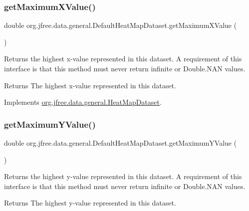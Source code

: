 \subsubsection{\texorpdfstring{get\+Maximum\+X\+Value()}{getMaximumXValue()}}
{\footnotesize\ttfamily double org.\+jfree.\+data.\+general.\+Default\+Heat\+Map\+Dataset.\+get\+Maximum\+X\+Value (\begin{DoxyParamCaption}{ }\end{DoxyParamCaption})}

Returns the highest x-\/value represented in this dataset. A requirement of this interface is that this method must never return infinite or Double.\+N\+AN values.

\begin{DoxyReturn}{Returns}
The highest x-\/value represented in this dataset. 
\end{DoxyReturn}


Implements \mbox{\hyperlink{interfaceorg_1_1jfree_1_1data_1_1general_1_1_heat_map_dataset_a252f69b25ce64302493167c5e8576cfe}{org.\+jfree.\+data.\+general.\+Heat\+Map\+Dataset}}.

\mbox{\label{classorg_1_1jfree_1_1data_1_1general_1_1_default_heat_map_dataset_a5d18e184f6950c93da573d964e692d5c}} 
\subsubsection{\texorpdfstring{get\+Maximum\+Y\+Value()}{getMaximumYValue()}}
{\footnotesize\ttfamily double org.\+jfree.\+data.\+general.\+Default\+Heat\+Map\+Dataset.\+get\+Maximum\+Y\+Value (\begin{DoxyParamCaption}{ }\end{DoxyParamCaption})}

Returns the highest y-\/value represented in this dataset. A requirement of this interface is that this method must never return infinite or Double.\+N\+AN values.

\begin{DoxyReturn}{Returns}
The highest y-\/value represented in this dataset. 
\end{DoxyReturn}


